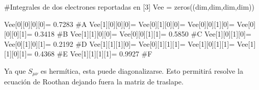 \documentclass[
  letterpaper,
  DIV=11,
  numbers=noendperiod]{scrreprt}
\newenvironment{Shaded}{\begin{snugshade}}{\end{snugshade}}
\newcommand{\CommentTok}[1]{\textcolor[rgb]{0.37,0.37,0.37}{#1}}
\newcommand{\DecValTok}[1]{\textcolor[rgb]{0.68,0.00,0.00}{#1}}
\newcommand{\FloatTok}[1]{\textcolor[rgb]{0.68,0.00,0.00}{#1}}
\newcommand{\NormalTok}[1]{\textcolor[rgb]{0.00,0.23,0.31}{#1}}
\newcommand{\OperatorTok}[1]{\textcolor[rgb]{0.37,0.37,0.37}{#1}}
\begin{document}
\begin{Shaded}
\begin{Highlighting}[]
\CommentTok{\#Integrales de dos electrones reportadas en [3]}
\NormalTok{Vee }\OperatorTok{=}\NormalTok{ zeros((dim,dim,dim,dim))}

\NormalTok{Vee[}\DecValTok{0}\NormalTok{][}\DecValTok{0}\NormalTok{][}\DecValTok{0}\NormalTok{][}\DecValTok{0}\NormalTok{]}\OperatorTok{=} \FloatTok{0.7283} \CommentTok{\#A}
\NormalTok{Vee[}\DecValTok{1}\NormalTok{][}\DecValTok{0}\NormalTok{][}\DecValTok{0}\NormalTok{][}\DecValTok{0}\NormalTok{]}\OperatorTok{=}\NormalTok{ Vee[}\DecValTok{0}\NormalTok{][}\DecValTok{1}\NormalTok{][}\DecValTok{0}\NormalTok{][}\DecValTok{0}\NormalTok{]}\OperatorTok{=}\NormalTok{ Vee[}\DecValTok{0}\NormalTok{][}\DecValTok{0}\NormalTok{][}\DecValTok{1}\NormalTok{][}\DecValTok{0}\NormalTok{]}\OperatorTok{=}\NormalTok{ Vee[}\DecValTok{0}\NormalTok{][}\DecValTok{0}\NormalTok{][}\DecValTok{0}\NormalTok{][}\DecValTok{1}\NormalTok{]}\OperatorTok{=} \FloatTok{0.3418} \CommentTok{\#B}
\NormalTok{Vee[}\DecValTok{1}\NormalTok{][}\DecValTok{1}\NormalTok{][}\DecValTok{0}\NormalTok{][}\DecValTok{0}\NormalTok{]}\OperatorTok{=}\NormalTok{ Vee[}\DecValTok{0}\NormalTok{][}\DecValTok{0}\NormalTok{][}\DecValTok{1}\NormalTok{][}\DecValTok{1}\NormalTok{]}\OperatorTok{=} \FloatTok{0.5850} \CommentTok{\#C}
\NormalTok{Vee[}\DecValTok{1}\NormalTok{][}\DecValTok{0}\NormalTok{][}\DecValTok{1}\NormalTok{][}\DecValTok{0}\NormalTok{]}\OperatorTok{=}\NormalTok{ Vee[}\DecValTok{0}\NormalTok{][}\DecValTok{1}\NormalTok{][}\DecValTok{0}\NormalTok{][}\DecValTok{1}\NormalTok{]}\OperatorTok{=} \FloatTok{0.2192} \CommentTok{\#D}
\NormalTok{Vee[}\DecValTok{1}\NormalTok{][}\DecValTok{1}\NormalTok{][}\DecValTok{1}\NormalTok{][}\DecValTok{0}\NormalTok{]}\OperatorTok{=}\NormalTok{ Vee[}\DecValTok{0}\NormalTok{][}\DecValTok{1}\NormalTok{][}\DecValTok{1}\NormalTok{][}\DecValTok{1}\NormalTok{]}\OperatorTok{=}\NormalTok{ Vee[}\DecValTok{1}\NormalTok{][}\DecValTok{0}\NormalTok{][}\DecValTok{1}\NormalTok{][}\DecValTok{1}\NormalTok{]}\OperatorTok{=}\NormalTok{ Vee[}\DecValTok{1}\NormalTok{][}\DecValTok{1}\NormalTok{][}\DecValTok{0}\NormalTok{][}\DecValTok{1}\NormalTok{]}\OperatorTok{=} \FloatTok{0.4368} \CommentTok{\#E}
\NormalTok{Vee[}\DecValTok{1}\NormalTok{][}\DecValTok{1}\NormalTok{][}\DecValTok{1}\NormalTok{][}\DecValTok{1}\NormalTok{]}\OperatorTok{=} \FloatTok{0.9927} \CommentTok{\#F}
\end{Highlighting}
\end{Shaded}

Ya que \(S_{\mu\nu}\) es hermítica, esta puede diagonalizarse. Esto
permitirá resolve la ecuación de Roothan dejando fuera la matriz de
traslape.
\end{document}
